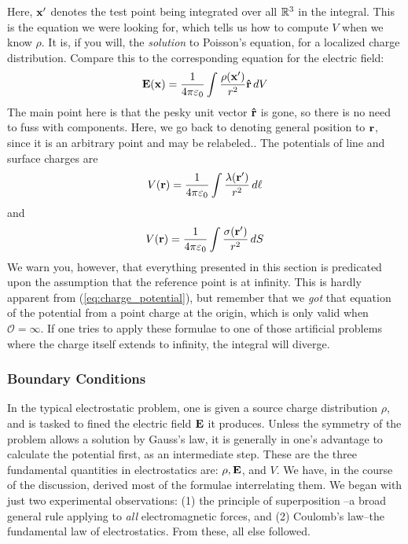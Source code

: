 		Here, $\vb x'$ denotes the test point being integrated over all $\mathbb{R}^3$ in the integral. 
		This is the equation we were looking for, which tells us how to compute $V$ when we know
		$\rho$. It is, if you will, the \textit{solution} to Poisson's equation, for a localized charge
		distribution. Compare this to the corresponding equation for the electric field:
		\begin{equation}
			\vb{E}(\vb x) = \frac{1}{4\pi\varepsilon_0} \int \frac{\rho(\vb x')}{r^2} \vu{r} \dd{V}
		\end{equation}
		The main point here is that the pesky unit vector $\vu{r}$ is gone, so there is no need to
		fuss with components. Here, we go back to denoting general position to $\vb r$, since it is an 
		arbitrary point and may be relabeled.. The potentials of line and surface charges are
		\begin{equation}
			V(\vb r) = \frac{1}{4\pi\varepsilon_0}\int \frac{\lambda(\vb r')}{r^2}\dd{\ell}  
		\end{equation}
		and
		\begin{equation}
			V(\vb r) = \frac{1}{4\pi\varepsilon_0}\int \frac{\sigma(\vb r')}{r^2}\dd{S}  
		\end{equation}
		We warn you, however, that everything presented in this section is predicated upon the assumption
		that the reference point is at infinity. This is hardly apparent from (\ref{eq:charge_potential}),
		but remember that we \textit{got} that equation of the potential from a point charge at the origin, which
		is only valid when $\mathcal{O} = \infty$. If one tries to apply these formulae to one of those 
		artificial problems where the charge itself extends to infinity, the integral will diverge.

	\subsubsection{Boundary Conditions}
		
		In the typical electrostatic problem, one is given a source charge distribution
		$\rho$, and is tasked to fined the electric field $\vb E$ it produces. Unless the
		symmetry of the problem allows a solution by Gauss's law, it is generally in one's 
		advantage to calculate the potential first, as an intermediate step. These are the 
		three fundamental quantities in electrostatics are: $\rho, \vb{E}$, and $V$. We have,
		in the course of the discussion, derived most of the formulae interrelating them.
		We began with just two experimental observations: (1) the principle of superposition%
		--a broad general rule applying to \textit{all} electromagnetic forces, and 
		(2) Coulomb's law--the fundamental law of electrostatics. From these, all else
		followed.

